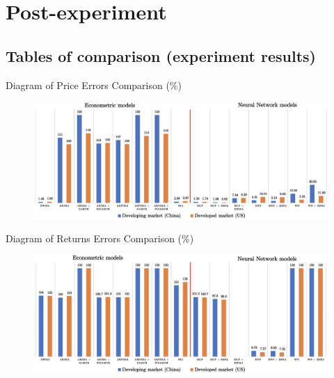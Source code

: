 \documentclass[11pt, aspectratio= 169]{beamer}
\begin{document}
	\section{Post-experiment}
	\subsection{Tables of comparison (experiment results)}
	\begin{frame}{Diagram of Price Errors Comparison (\%)}
		\begin{figure}[H]
			\includegraphics[width= 14cm]{table_prices.png}
		\end{figure}
	\end{frame}

	\begin{frame}{Diagram of Returns Errors Comparison (\%)}
		\begin{figure}[H]
			\includegraphics[width= 14cm]{table_returns.png}
		\end{figure}
	\end{frame}
	
\end{document}
